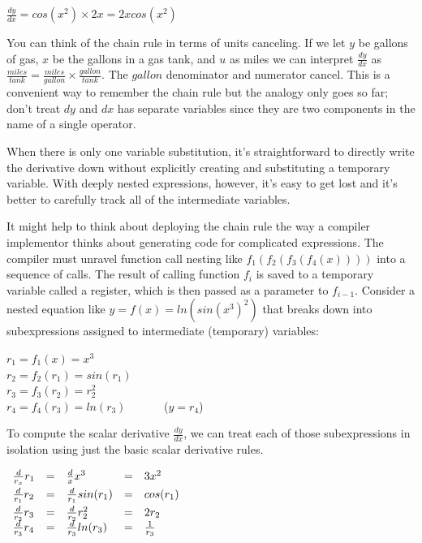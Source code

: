 \documentclass[11pt]{article}
\begin{document}
$\frac{dy}{dx} = cos(x^2) \times 2x = 2xcos(x^2)$

You can think of the chain rule in terms of units canceling. If we let $y$ be gallons of gas, $x$ be the gallons in a gas tank, and $u$ as miles we can interpret $\frac{dy}{dx}$ as $\frac{miles}{tank} = \frac{miles}{gallon} \times \frac{gallon}{tank}$. The $gallon$ denominator and numerator cancel. This is a convenient way to remember the chain rule but the analogy only goes so far; don't treat $dy$ and $dx$ has separate variables since they are two components in the name of a single operator.

When there is only one variable substitution, it's straightforward to directly write the derivative down without explicitly creating and substituting a temporary variable. With deeply nested expressions, however, it's easy to get lost and it's better to carefully track all of the intermediate variables.

It might help to think about deploying the chain rule the way a compiler implementor thinks about generating code for complicated expressions.  The compiler must unravel function call nesting like $f_1(f_2(f_3(f_4(x))))$ into a sequence of calls. The result of calling function $f_i$ is saved to a temporary variable called a register, which is then passed as a parameter to $f_{i-1}$.  Consider a nested equation like $y = f(x) = ln(sin(x^3)^2)$ that breaks down into subexpressions assigned to  intermediate (temporary) variables:

$r_1 = f_1(x) = x^3$\\
$r_2 = f_2(r_1) = sin(r_1)$\\
$r_3 = f_3(r_2) = r_2^2$\\
$r_4 = f_4(r_3) = ln(r_3)$ ~~~~~~($y = r_4$)

To compute the scalar derivative $\frac{dy}{dx}$, we can treat each of those subexpressions in isolation using just the basic scalar derivative rules.

$
\begin{array}{lllll}
\vspace{1mm}
\frac{d}{r_x} r_1 & = & \frac{d}{x} x^3 & = & 3x^2\\
\vspace{1mm}
\frac{d}{r_1} r_2 & = & \frac{d}{r_1} sin(r_1) & = & cos(r_1) \\
\frac{d}{r_2} r_3 & = & \frac{d}{r_2} r_2^2 & =& 2r_2\\
\frac{d}{r_3} r_4 & = & \frac{d}{r_3} ln(r_3) & =& \frac{1}{r_3}\\
\end{array}
$
\end{document}
